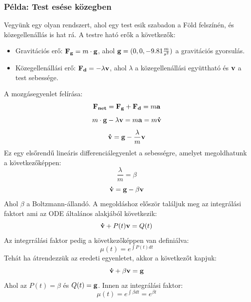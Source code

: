 \documentclass[a4paper,12pt]{article}
\begin{document}
\subsubsection*{Példa: Test esése közegben}
Vegyünk egy olyan rendszert, ahol egy test esik szabadon a Föld felszínén, és közegellenállás is hat rá. A testre ható erők a következők:
\begin{itemize}
    \item Gravitációs erő: $\bold{F_g} = m\cdot \bold{g}$, ahol $\bold{g} = (0, 0, -9.81 \frac{m}{s^2})$ a gravitációs gyorsulás.
    \item Közegellenállási erő: $\bold{F_d} = -\lambda\bold{v}$, ahol $\lambda$ a közegellenállási együttható és $\bold{v}$ a test sebessége.
\end{itemize}
A mozgásegyenlet felírása:
\begin{equation}
    \bold{F_{net}} = \bold{F_g} + \bold{F_d} = m\bold{a}
\end{equation}
\begin{equation}
    m\cdot \bold{g} - \lambda\bold{v} = m\bold{a} = m\bold{\dot{v}}
\end{equation}
\begin{equation}
    \bold{\dot{v}} = \bold{g} - \frac{\lambda}{m}\bold{v}
\end{equation}
Ez egy elsőrendű lineáris differenciálegyenlet a sebességre, amelyet megoldhatunk a következőképpen:
\begin{equation}
    \frac{\lambda}{m} = \beta
\end{equation}
\begin{equation}
    \bold{\dot{v}} = \bold{g} - \beta\bold{v}
\end{equation}
Ahol $\beta$ a Boltzmann-állandó. A megoldáshoz először találjuk meg az integrálási faktort ami az ODE általános alakjából következik:
\begin{equation}
    \bold{\dot{v}} + P(t)\bold{v} = Q(t)
\end{equation}
Az integrrálási faktor pedig a következőképpen van definiálva:
\begin{equation}
    \mu(t) = e^{\int P(t) dt}
\end{equation}
Tehát ha átrendezzük az eredeti egyenletet, akkor a következőt kapjuk:
\begin{equation}
    \bold{\dot{v}} + \beta\bold{v} = \bold{g}
\end{equation}
Ahol az $P(t) = \beta$ és $Q(t) = \bold{g}$. Innen az integrálási faktor:
\begin{equation}
    \mu(t) = e^{\int \beta dt} = e^{\beta t}
\end{equation}
\end{document}
